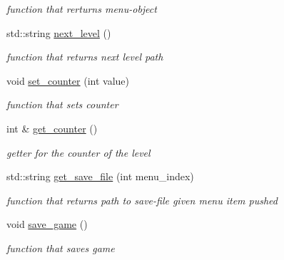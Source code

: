 \begin{DoxyCompactItemize}
\begin{DoxyCompactList}\small\item\em function that rerturns menu-\/object \end{DoxyCompactList}\item 
std\+::string \hyperlink{classfile__management_a75689c420580c71f0621dfbcc4c2a06f}{next\+\_\+level} ()
\begin{DoxyCompactList}\small\item\em function that returns next level path \end{DoxyCompactList}\item 
void \hyperlink{classfile__management_a291475384add5bdb8002127c71c568ac}{set\+\_\+counter} (int value)
\begin{DoxyCompactList}\small\item\em function that sets counter \end{DoxyCompactList}\item 
int \& \hyperlink{classfile__management_ae6291547fab57a5b861c52e970175854}{get\+\_\+counter} ()
\begin{DoxyCompactList}\small\item\em getter for the counter of the level \end{DoxyCompactList}\item 
std\+::string \hyperlink{classfile__management_a92ece2d05964c828dcb9bf6c59043327}{get\+\_\+save\+\_\+file} (int menu\+\_\+index)
\begin{DoxyCompactList}\small\item\em function that returns path to save-\/file given menu item pushed \end{DoxyCompactList}\item 
void \hyperlink{classfile__management_a79e6ae7cec63aa959d7d0730d6ffa5a3}{save\+\_\+game} ()
\begin{DoxyCompactList}\small\item\em function that saves game \end{DoxyCompactList}\end{DoxyCompactItemize}
